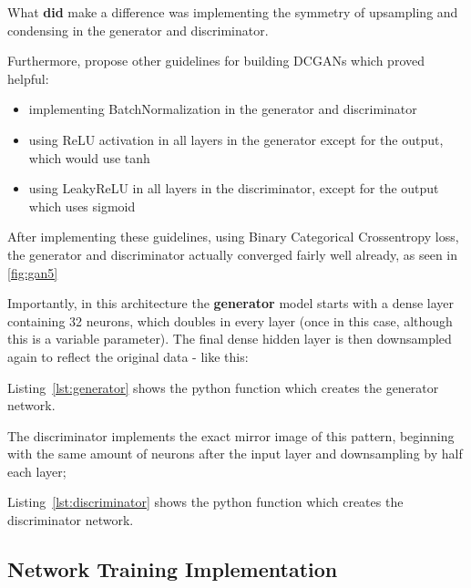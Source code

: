 What \textbf{did} make a difference was implementing the symmetry of upsampling and condensing in the generator and discriminator.

Furthermore, \cite{dcgan} propose other guidelines for building \acp{DCGAN} which proved helpful:

\begin{itemize}
	\item implementing BatchNormalization in the generator and discriminator \cite{batchnorm}
	\item using ReLU activation in all layers in the generator except for the output, which would use tanh
	\item using LeakyReLU in all layers in the discriminator, except for the output which uses sigmoid
\end{itemize}

After implementing these guidelines, using Binary Categorical Crossentropy loss, the generator and discriminator actually converged fairly well already, as seen in \ref{fig:gan5}


Importantly, in this architecture the \textbf{generator} model starts with a dense layer containing 32 neurons, which doubles in every layer (once in this case, although this is a variable parameter). The final dense hidden layer is then downsampled again to reflect the original data - like this:


Listing~\ref{lst:generator} shows the python function which creates the generator network.

\pagebreak 

The discriminator implements the exact mirror image of this pattern, beginning with the same amount of neurons after the input layer and downsampling by half each layer; 


Listing~\ref{lst:discriminator} shows the python function which creates the discriminator network.

\pagebreak 

\subsection{Network Training Implementation}

